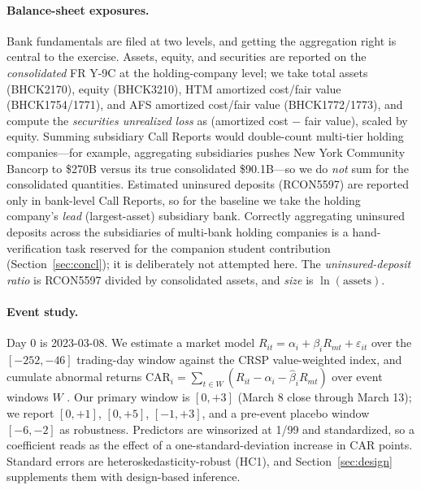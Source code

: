 \documentclass[12pt]{article}
\begin{document}
\paragraph{Balance-sheet exposures.} Bank fundamentals are filed at two levels, and getting
the aggregation right is central to the exercise. Assets, equity, and securities are reported
on the \emph{consolidated} FR Y-9C at the holding-company level; we take total assets
(BHCK2170), equity (BHCK3210), HTM amortized cost/fair value (BHCK1754/1771), and AFS
amortized cost/fair value (BHCK1772/1773), and compute the \emph{securities unrealized loss}
as (amortized cost $-$ fair value), scaled by equity. Summing subsidiary Call Reports would
double-count multi-tier holding companies---for example, aggregating subsidiaries pushes New
York Community Bancorp to \$270B versus its true consolidated \$90.1B---so we do \emph{not}
sum for the consolidated quantities. Estimated uninsured deposits (RCON5597) are reported
only in bank-level Call Reports, so for the baseline we take the holding company's
\emph{lead} (largest-asset) subsidiary bank. Correctly aggregating uninsured deposits across
the subsidiaries of multi-bank holding companies is a hand-verification task reserved for the
companion student contribution (Section~\ref{sec:concl}); it is deliberately not attempted
here. The \emph{uninsured-deposit ratio} is RCON5597 divided by consolidated assets, and
\emph{size} is $\ln(\text{assets})$.

\paragraph{Event study.} Day 0 is 2023-03-08. We estimate a market model
$R_{it}=\alpha_i+\beta_i R_{mt}+\varepsilon_{it}$ over the $[-252,-46]$ trading-day window
against the CRSP value-weighted index, and cumulate abnormal returns
$\text{CAR}_i=\sum_{t\in W}(R_{it}-\hat\alpha_i-\hat\beta_i R_{mt})$ over event windows $W$
\citep{mackinlay1997}. Our primary window is $[0,+3]$ (March 8 close through March 13); we
report $[0,+1]$, $[0,+5]$, $[-1,+3]$, and a pre-event placebo window $[-6,-2]$ as
robustness. Predictors are winsorized at 1/99 and standardized, so a coefficient reads as
the effect of a one-standard-deviation increase in CAR points. Standard errors are
heteroskedasticity-robust (HC1), and Section~\ref{sec:design} supplements them with
design-based inference.
\end{document}
